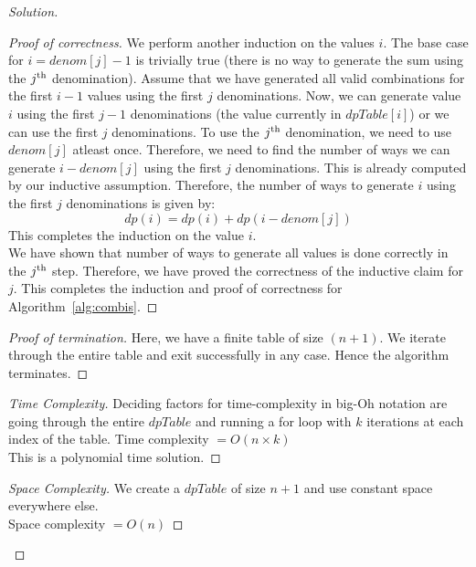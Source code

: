 \begin{solution}{4.1}
\begin{proof}[Solution]
\begin{proof}[Proof of correctness]
            We perform another induction on the values $i$. The base case for $i=denom[j]-1$ is trivially true (there is no way to generate the sum using the $j\textsuperscript{th}$ denomination). Assume that we have generated all valid combinations for the first $i-1$ values using the first $j$ denominations. Now, we can generate value $i$ using the first $j-1$ denominations (the value currently in $dpTable[i]$) or we can use the first $j$ denominations. To use the $j\textsuperscript{th}$
            denomination, we need to use $denom[j]$ atleast once. Therefore, we need to find the number of ways we can generate $i-denom[j]$ using the first $j$ denominations. This is already computed by our inductive assumption. Therefore, the number of ways to generate $i$ using the first $j$ denominations is given by:
            \begin{equation}
                dp(i) = dp(i) + dp(i - denom[j])
            \end{equation}
            This completes the induction on the value $i$.\\
            We have shown that number of ways to generate all values is done correctly in the $j\textsuperscript{th}$ step. Therefore, we have proved the correctness of the inductive claim for $j$.
            This completes the induction and proof of correctness for Algorithm~\ref{alg:combis}.
        \end{proof}
        \begin{proof}[Proof of termination]
            Here, we have a finite table of size $(n+1)$. We iterate through the entire table and exit successfully in any case. Hence the algorithm terminates.
        \end{proof}
        \begin{proof}[Time Complexity]
        Deciding factors for time-complexity in big-Oh notation are going through the entire $dpTable$ and running a for loop with $k$ iterations at each index of the table.
        Time complexity $=O(n\times k)$\\
        This is a polynomial time solution.
        \end{proof}
        \begin{proof}[Space Complexity]
        We create a $dpTable$ of size $n+1$ and use constant space everywhere else.\\
        Space complexity $=O(n)$
        \end{proof}
    \end{proof}
\end{solution}
